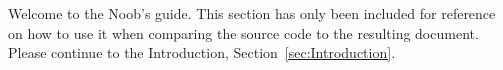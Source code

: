 Welcome to the Noob's guide.
This section has only been included for reference on how to use it when comparing the source code to the resulting document.
Please continue to the Introduction, Section~\ref{sec:Introduction}.
